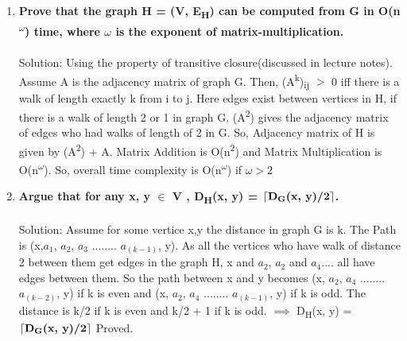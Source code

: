 \documentclass[a4paper]{article}
\newcommand{\ceil}[1]{\left\lceil #1 \right\rceil}
\begin{document}
\begin{enumerate}[label=(\alph*)]
\item \textbf{
Prove that the graph H = (V, E\textsubscript{H}) can be computed from G in O(n\textsuperscript{$\omega$}) time, where $\omega$ is the exponent of matrix-multiplication.}
\\\\
Solution: Using the property of transitive closure(discussed in lecture notes). Assume A is the adjacency matrix of graph G. Then, (A\textsuperscript{k})\textsubscript{ij} $>$ 0 iff there is a walk of length exactly k from i to j. Here edges exist between vertices in H, if there is a walk of length 2 or 1 in graph G. (A\textsuperscript{2}) gives the adjacency matrix of edges who had walks of length of 2 in G. So, Adjacency matrix of H is given by (A\textsuperscript{2}) + A. Matrix Addition is O(n\textsuperscript{2}) and Matrix Multiplication is O(n\textsuperscript{$\omega$}). So, overall time complexity is O(n\textsuperscript{$\omega$}) if $\omega > 2$\\

\item \textbf{
Argue that for any x, y $\in$ V , D\textsubscript{H}(x, y) = $\ceil{ \textbf{D\textsubscript{G}(x, y)/2} }$. }
\\\\
Solution: Assume for some vertice x,y the distance in graph G is k. The Path is (x,$a_1$, $a_2$, $a_3$ ........ $a_(k-1)$, y). As all the vertices who have walk of distance 2 between them get edges in the graph H, x and $a_2$, $a_2$ and $a_4$.... all have edges between them. So the path between x and y becomes (x, $a_2$, $a_4$ ........ $a_(k-2)$, y) if k is even and (x, $a_2$, $a_4$ ........ $a_(k-1)$, y) if k is odd. The distance is k/2 if k is even and k/2 + 1 if k is odd.
$\implies $ D\textsubscript{H}(x, y) = $\ceil{ \textbf{D\textsubscript{G}(x, y)/2} }$
Proved. 



\end{enumerate}
\end{document}
